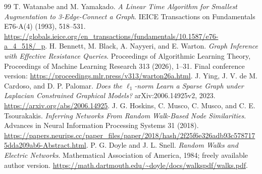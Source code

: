 \documentclass[11pt,letterpaper]{article}
\begin{document}
\begin{thebibliography}{99}
 T. Watanabe and M. Yamakado. \emph{A Linear Time Algorithm for Smallest Augmentation to 3-Edge-Connect a Graph}. IEICE Transactions on Fundamentals E76-A(4) (1993), 518--531. \url{https://globals.ieice.org/en_transactions/fundamentals/10.1587/e76-a_4_518/_p}.
 H. Bennett, M. Black, A. Nayyeri, and E. Warton. \emph{Graph Inference with Effective Resistance Queries}. Proceedings of Algorithmic Learning Theory, Proceedings of Machine Learning Research 313 (2026), 1--31. Final conference version: \url{https://proceedings.mlr.press/v313/warton26a.html}.
 J. Ying, J. V. de M. Cardoso, and D. P. Palomar. \emph{Does the $\ell_1$-norm Learn a Sparse Graph under Laplacian Constrained Graphical Models?} arXiv:2006.14925v2, 2023. \url{https://arxiv.org/abs/2006.14925}.
 J. G. Hoskins, C. Musco, C. Musco, and C. E. Tsourakakis. \emph{Inferring \mbox{Networks} From Random Walk-Based Node Similarities}. Advances in Neural Information Processing Systems 31 (2018). \url{https://papers.neurips.cc/paper_files/paper/2018/hash/2f25f6e326adb93c5787175dda209ab6-Abstract.html}.
 P. G. Doyle and J. L. Snell. \emph{Random Walks and Electric Networks}. Mathematical Association of America, 1984; freely available author version. \url{https://math.dartmouth.edu/~doyle/docs/walkspdf/walks.pdf}.
\end{thebibliography}
\end{document}
